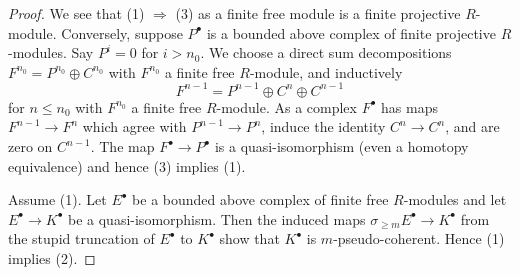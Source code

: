 \begin{proof}
We see that (1) $\Rightarrow$ (3) as a finite free module is a finite
projective $R$-module. Conversely, suppose $P^\bullet$ is a bounded
above complex of finite projective $R$-modules. Say $P^i = 0$ for
$i > n_0$. We choose a direct sum decompositions
$F^{n_0} = P^{n_0} \oplus C^{n_0}$ with $F^{n_0}$ a finite free
$R$-module, and inductively
$$
F^{n - 1} = P^{n - 1} \oplus C^n \oplus C^{n - 1}
$$
for $n \leq n_0$ with $F^{n_0}$ a finite free $R$-module. As a complex
$F^\bullet$ has maps $F^{n - 1} \to F^n$ which agree with $P^{n - 1} \to P^n$,
induce the identity $C^n \to C^n$, and are zero on $C^{n - 1}$. The map
$F^\bullet \to P^\bullet$ is a quasi-isomorphism (even a homotopy equivalence)
and hence (3) implies (1).

\medskip\noindent
Assume (1). Let $E^\bullet$ be a bounded above complex of finite free
$R$-modules and let $E^\bullet \to K^\bullet$ be a
quasi-isomorphism. Then the induced maps
$\sigma_{\geq m}E^\bullet \to K^\bullet$ from the stupid truncation
of $E^\bullet$ to $K^\bullet$ show that $K^\bullet$ is $m$-pseudo-coherent.
Hence (1) implies (2).


\end{proof}
